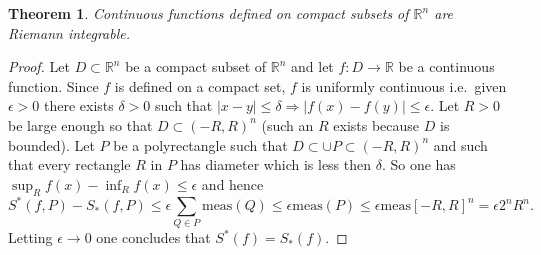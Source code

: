 \documentclass[12pt]{article}
\newcommand{\R}{\mathbb R}
\newtheorem{theorem}{Theorem}
\begin{document}
\begin{theorem}
Continuous functions defined on compact subsets of $\R^n$ are Riemann integrable.
\end{theorem}
\begin{proof}
Let $D\subset \R^n$ be a compact subset of $\R^n$ and let $f\colon D\to \R$ be a continuous function. 
Since $f$ is defined on a compact set, $f$ is uniformly continuous i.e.\ given $\epsilon>0$ there exists $\delta>0$ such that $|x-y|\le \delta \Rightarrow |f(x)-f(y)|\le \epsilon$. 
Let $R>0$ be large enough so that $D\subset (-R,R)^n$ (such an $R$ exists because $D$ is bounded).
Let $P$ be a polyrectangle such that $D\subset \cup P \subset (-R,R)^n$ and such that every rectangle $R$ in $P$ has diameter which is less then $\delta$. So one has $\sup_R f(x)-\inf_R f(x) \le \epsilon$ and hence
\[
 S^*(f,P)-S_*(f,P)\le \epsilon \sum_{Q\in P} \mathrm{meas} (Q) \le \epsilon \mathrm{meas}(P) \le \epsilon \mathrm{meas}[-R,R]^n = \epsilon 2^n R^n.
\]
Letting $\epsilon\to 0$ one concludes that $S^*(f)=S_*(f)$.
\end{proof}
\end{document}
